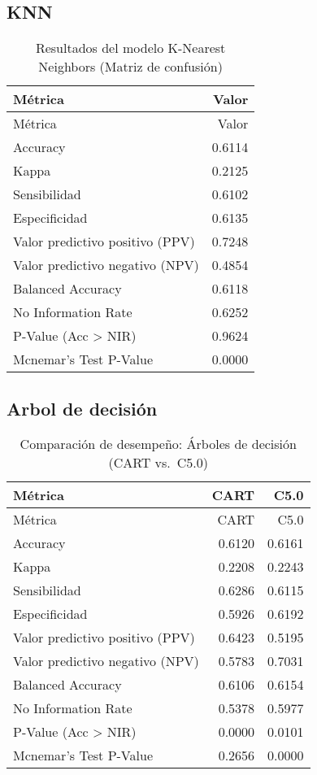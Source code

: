\documentclass[Royal,times,sageh]{sagej}
\begin{document}
\subsection{KNN}\label{knn}

\begin{longtable}[]{@{}lr@{}}
\caption{Resultados del modelo K-Nearest Neighbors (Matriz de
confusión)}\tabularnewline
\toprule\noalign{}
Métrica & Valor \\
\midrule\noalign{}
\endfirsthead
\toprule\noalign{}
Métrica & Valor \\
\midrule\noalign{}
\endhead
\bottomrule\noalign{}
\endlastfoot
Accuracy & 0.6114 \\
Kappa & 0.2125 \\
Sensibilidad & 0.6102 \\
Especificidad & 0.6135 \\
Valor predictivo positivo (PPV) & 0.7248 \\
Valor predictivo negativo (NPV) & 0.4854 \\
Balanced Accuracy & 0.6118 \\
No Information Rate & 0.6252 \\
P-Value (Acc \textgreater{} NIR) & 0.9624 \\
Mcnemar's Test P-Value & 0.0000 \\
\end{longtable}

\subsection{Arbol de decisión}\label{arbol-de-decisiuxf3n}

\begin{longtable}[]{@{}lrr@{}}
\caption{Comparación de desempeño: Árboles de decisión (CART
vs.~C5.0)}\tabularnewline
\toprule\noalign{}
Métrica & CART & C5.0 \\
\midrule\noalign{}
\endfirsthead
\toprule\noalign{}
Métrica & CART & C5.0 \\
\midrule\noalign{}
\endhead
\bottomrule\noalign{}
\endlastfoot
Accuracy & 0.6120 & 0.6161 \\
Kappa & 0.2208 & 0.2243 \\
Sensibilidad & 0.6286 & 0.6115 \\
Especificidad & 0.5926 & 0.6192 \\
Valor predictivo positivo (PPV) & 0.6423 & 0.5195 \\
Valor predictivo negativo (NPV) & 0.5783 & 0.7031 \\
Balanced Accuracy & 0.6106 & 0.6154 \\
No Information Rate & 0.5378 & 0.5977 \\
P-Value (Acc \textgreater{} NIR) & 0.0000 & 0.0101 \\
Mcnemar's Test P-Value & 0.2656 & 0.0000 \\
\end{longtable}
\end{document}
